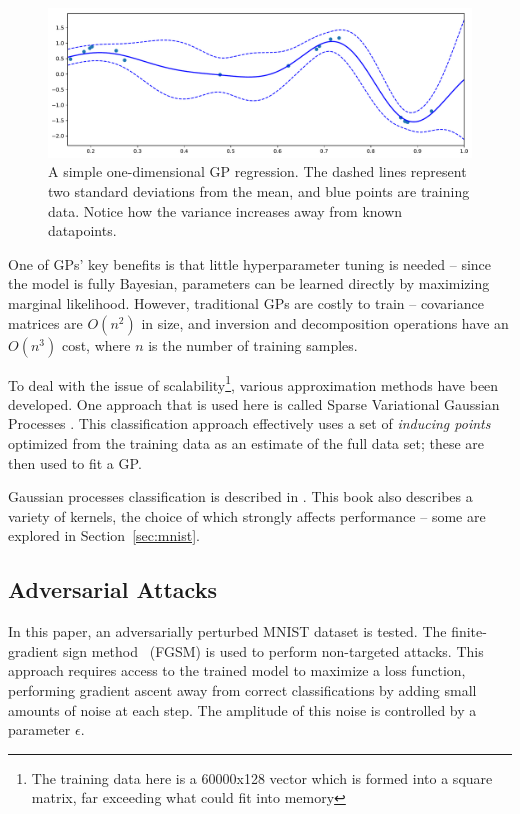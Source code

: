 \documentclass{article}
\begin{document}
\begin{figure}[htb]
\centering
\includegraphics[width=\hsize]{figures/gp_basic.pdf}
\caption{A simple one-dimensional GP regression. The dashed lines represent two standard deviations from the mean, and blue points are training data. Notice how the variance increases away from known datapoints.}
\label{fig:gp:basic}
\end{figure}

One of GPs' key benefits is that little hyperparameter tuning is needed -- since the model is fully Bayesian, parameters can be learned directly by maximizing marginal likelihood. However, traditional GPs are costly to train -- covariance matrices are $O(n^2)$ in size, and inversion and decomposition operations have an $O(n^3)$ cost, where $n$ is the number of training samples.

To deal with the issue of scalability\footnote{The training data here is a 60000x128 vector which is formed into a square matrix, far exceeding what could fit into memory}, various approximation methods have been developed. One approach that is used here is called Sparse Variational Gaussian Processes \cite{hensman2015scalable}. This classification approach effectively uses a set of \textit{inducing points} optimized from the training data as an estimate of the full data set; these are then used to fit a GP.

Gaussian processes classification is described in \citet*{rasmussen2006gaussian}. This book also describes a variety of kernels, the choice of which strongly affects performance -- some are explored in Section~\ref{sec:mnist}. 

\subsection{Adversarial Attacks}
\label{sec:background:adv}
% 
In this paper, an adversarially perturbed MNIST dataset is tested. The finite-gradient sign method~\cite{goodfellow2014explaining} (FGSM) is used to perform non-targeted attacks. This approach requires access to the trained model to maximize a loss function, performing gradient ascent away from correct classifications by adding small amounts of noise at each step. The amplitude of this noise is controlled by a parameter $\epsilon$.
\end{document}
